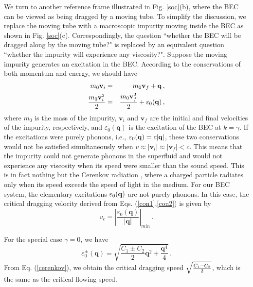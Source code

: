 \documentclass[doublecol]{epl2}
\begin{document}
We turn to another reference frame illustrated in Fig. \ref{soc}(b), where
the BEC can be viewed as being dragged by a moving tube. To simplify the
discussion, we replace the moving tube with a macroscopic impurity moving
inside the BEC as shown in Fig. \ref{soc}(c). Correspondingly, the question
``whether the BEC will be dragged along by the moving tube?" is replaced by
an equivalent question ``whether the impurity will experience any
viscosity?". Suppose the moving impurity generates an excitation in the BEC.
According to the conservations of both momentum and energy, we should have
\begin{eqnarray}  \label{con1}
m_0{\mathbf{v}}_i&=&m_0{\mathbf{v}}_f+{\mathbf{q}}\,, \\
\frac{m_0{\mathbf{v}}_i^2}{2}&=&\frac{m_0{\mathbf{v}}_f^2}{2}+\varepsilon_0({%
\mathbf{q}})\,,  \label{con2}
\end{eqnarray}
where $m_0$ is the mass of the impurity, ${\mathbf{v}}_i$ and ${\mathbf{v}}_f
$ are the initial and final velocities of the impurity, respectively, and $%
\varepsilon_0({\mathbf{q}})$ is the excitation of the BEC at $k=\gamma$. If
the excitations were purely phonons, i.e., $\varepsilon_0({\mathbf{q}})=c|{%
\mathbf{q}}|$, these two conservations would not be satisfied simultaneously
when $v\approx|{\mathbf{v}}_i|\approx|{\mathbf{v}}_f|<c$. This means that
the impurity could not generate phonons in the superfluid and would not
experience any viscosity when its speed were smaller than the sound speed.
This is in fact nothing but the Cerenkov radiation \cite{key2,key3}, where a
charged particle radiates only when its speed exceeds the speed of light in
the medium. For our BEC system, the elementary excitations $\varepsilon_0({%
\mathbf{q}})$ are not purely phonons. In this case, the critical dragging
velocity derived from Eqs. (\ref{con1},\ref{con2}) is given by
\begin{equation}
v_c=\left|\frac{\varepsilon_0({\mathbf{q}})}{|{\mathbf{q}}|}\right|_{min}\,.
\label{cerenkov}
\end{equation}

For the special case $\gamma=0$, we have
\begin{equation}
\varepsilon _{0}^{\pm }({\mathbf{q}})=\sqrt{\frac{C_{1}\pm C_{2}}{2}{\mathbf{q%
}}^{2}+\frac{{\mathbf{q}}^{4}}{4}}\,.
\end{equation}
From Eq. (\ref{cerenkov}), we obtain the critical dragging speed $\sqrt{%
\frac{C_{1}- C_{2}}{2}}$, which is the same as the critical flowing speed.
\end{document}
